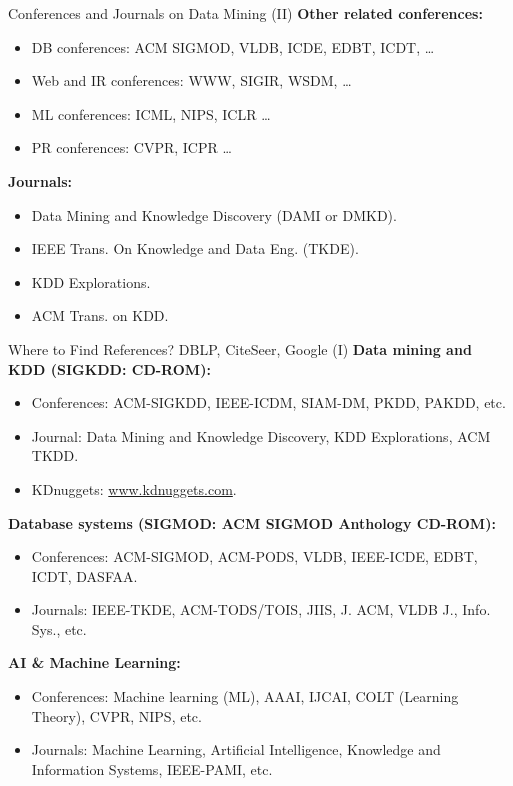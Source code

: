 \documentclass[aspectratio=169,t]{beamer}
\begin{document}
  {
    \begin{frame}{Conferences and Journals on Data Mining (II)}
    \textbf{Other related conferences:}
        \begin{itemize}
            \item DB conferences: ACM SIGMOD, VLDB, ICDE, EDBT, ICDT, \ldots
            \item Web and IR conferences: WWW, SIGIR, WSDM, \ldots
            \item ML conferences: ICML, NIPS, ICLR \ldots
            \item PR conferences: CVPR, ICPR \ldots
        \end{itemize}
    \textbf{Journals:}
        \begin{itemize}
            \item Data Mining and Knowledge Discovery (DAMI or DMKD).
            \item IEEE Trans. On Knowledge and Data Eng. (TKDE).
            \item KDD Explorations.
            \item ACM Trans. on KDD.
        \end{itemize}
    \end{frame}
  }

  {
    \begin{frame}{Where to Find References? DBLP, CiteSeer, Google (I)}
    \textbf{Data mining and KDD (SIGKDD: CD-ROM):}
        \begin{itemize}
            \item Conferences: ACM-SIGKDD, IEEE-ICDM, SIAM-DM, PKDD, PAKDD, etc.
            \item Journal: Data Mining and Knowledge Discovery, KDD Explorations, ACM TKDD.
            \item KDnuggets: \url{www.kdnuggets.com}.
        \end{itemize}
    \textbf{Database systems (SIGMOD: ACM SIGMOD Anthology CD-ROM):}
        \begin{itemize}
            \item Conferences: ACM-SIGMOD, ACM-PODS, VLDB, IEEE-ICDE, EDBT, ICDT, DASFAA.
            \item Journals: IEEE-TKDE, ACM-TODS/TOIS, JIIS, J. ACM, VLDB J., Info. Sys., etc.
        \end{itemize}
    \textbf{AI \& Machine Learning:}
        \begin{itemize}
            \item Conferences: Machine learning (ML), AAAI, IJCAI, COLT (Learning Theory), CVPR, NIPS, etc.
            \item Journals: Machine Learning, Artificial Intelligence, Knowledge and Information Systems, IEEE-PAMI, etc.
        \end{itemize}
    \end{frame}
  }
\end{document}

